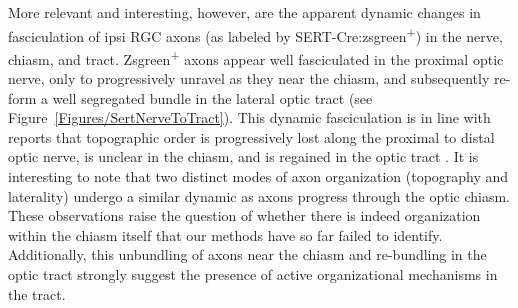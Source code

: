 More relevant and interesting, however, are the apparent dynamic changes in fasciculation of ipsi RGC axons (as labeled by SERT-Cre:zsgreen\textsuperscript{+}) in the nerve, chiasm, and tract.
Zsgreen\textsuperscript{+} axons appear well fasciculated in the proximal optic nerve, only to progressively unravel as they near the chiasm, and subsequently re-form a well segregated bundle in the lateral optic tract (see Figure~\ref{Figures/SertNerveToTract}).
This dynamic fasciculation is in line with reports that topographic order is progressively lost along the proximal to distal optic nerve, is unclear in the chiasm, and is regained in the optic tract \cite{torrealba1982studies,reh1983organization,reese1993reestablishment,chan1994changes,chan1999changes,plas2005pretarget}.
It is interesting to note that two distinct modes of axon organization (topography and laterality) undergo a similar dynamic as axons progress through the optic chiasm.
These observations raise the question of whether there is indeed organization within the chiasm itself that our methods have so far failed to identify.
Additionally, this unbundling of axons near the chiasm and re-bundling in the optic tract strongly suggest the presence of active organizational mechanisms in the tract. 